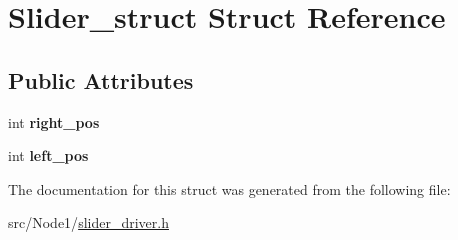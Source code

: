 \hypertarget{structSlider__struct}{}\section{Slider\+\_\+struct Struct Reference}
\label{structSlider__struct}
\subsection*{Public Attributes}
\begin{DoxyCompactItemize}
\item 
int {\bfseries right\+\_\+pos}\hypertarget{structSlider__struct_aee0ff7cdcb5a03444b2e6e2ae6f93b1f}{}\label{structSlider__struct_aee0ff7cdcb5a03444b2e6e2ae6f93b1f}

\item 
int {\bfseries left\+\_\+pos}\hypertarget{structSlider__struct_a53f4603efbe10f8360bd70e076918132}{}\label{structSlider__struct_a53f4603efbe10f8360bd70e076918132}

\end{DoxyCompactItemize}


The documentation for this struct was generated from the following file\+:\begin{DoxyCompactItemize}
\item 
src/\+Node1/\hyperlink{slider__driver_8h}{slider\+\_\+driver.\+h}\end{DoxyCompactItemize}
